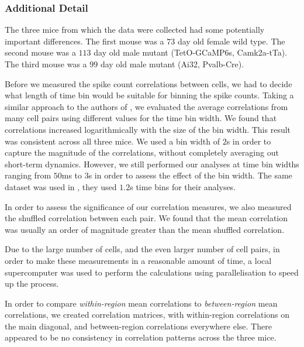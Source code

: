 \documentclass[a4paper,12pt]{article}
\theoremstyle{definition}
\begin{document}
\subsubsection*{Additional Detail}
The three mice from which the data were collected had some potentially important differences. The first mouse was a $73$ day old female wild type. The second mouse was a $113$ day old male mutant (TetO-GCaMP6s, Camk2a-tTa). The third mouse was a $99$ day old male mutant (Ai32, Pvalb-Cre).

Before we measured the spike count correlations between cells, we had to decide what length of time bin would be suitable for binning the spike counts. Taking a similar approach to the authors of \cite{cohen2}, we evaluated the average correlations from many cell pairs using different values for the time bin width. We found that correlations increased logarithmically with the size of the bin width. This result was consistent across all three mice. We used a bin width of $2$s in order to capture the magnitude of the correlations, without completely averaging out short-term dynamics. However, we still performed our analyses at time bin widths ranging from $50$ms to $3$s in order to assess the effect of the bin width. The same dataset was used in \cite{stringer}, they used $1.2$s time bins for their analyses.

In order to assess the significance of our correlation measures, we also measured the shuffled correlation between each pair. We found that the mean correlation was usually an order of magnitude greater than the mean shuffled correlation. 

Due to the large number of cells, and the even larger number of cell pairs, in order to make these measurements in a reasonable amount of time, a local supercomputer was used to perform the calculations using parallelisation to speed up the process.

In order to compare \textit{within-region} mean correlations to \textit{between-region} mean correlations, we created correlation matrices, with within-region correlations on the main diagonal, and between-region correlations everywhere else. There appeared to be no consistency in correlation patterns across the three mice.
\end{document}
